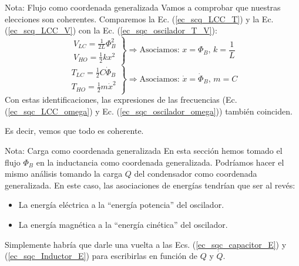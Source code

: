         \begin{mybox_blue}{Nota: Flujo como coordenada generalizada}
            Vamos a comprobar que nuestras elecciones son coherentes. Comparemos la Ec. (\ref{ec_scq_LCC_T}) y la Ec. (\ref{ec_scq_LCC_V}) con la Ec. (\ref{ec_sqc_oscilador_T_V}):
            \begin{equation}
                \left.
                \begin{aligned}
                    V_{LC} = \frac{1}{2L} \Phi_B^2 \\
                    V_{HO} = \frac{1}{2} k x^2
                \end{aligned}
                \right\} \Rightarrow \text{Asociamos: } x = \Phi_B, \, k = \frac{1}{L} 
            \end{equation}
            \begin{equation}
                \left.
                \begin{aligned}
                    T_{LC} = \frac{1}{2} C \dot{\Phi}_B\\
                    T_{HO} = \frac{1}{2} m \dot{x}^2
                \end{aligned}
                \right\} \Rightarrow \text{Asociamos: } \dot{x} = \dot{\Phi}_B, \, m = C
            \end{equation}
            Con estas identificaciones, las expresiones de las frecuencias (Ec. (\ref{ec_sqc_LCC_omega}) y Ec. (\ref{ec_sqc_oscilador_omega})) también coinciden. 
            \vspace{0.3cm}
            
            Es decir, vemos que todo es coherente. 
        \end{mybox_blue}

        \begin{mybox_blue}{Nota: Carga como coordenada generalizada}
            En esta sección hemos tomado el flujo $\Phi_B$ en la inductancia como coordenada generalizada. Podríamos hacer el mismo análisis tomando la carga $Q$ del condensador como coordenada generalizada.  En este caso, las asociaciones de energías tendrían que ser al revés:
            \begin{itemize}
                \item La energía eléctrica a la ``energía potencia'' del oscilador.  
                \item La energía magnética a la ``energía cinética'' del oscilador.  
            \end{itemize}
            Simplemente habría que darle una vuelta a las Ecs. (\ref{ec_sqc_capacitor_E}) y (\ref{ec_sqc_Inductor_E}) para escribirlas en función de $Q$ y $\dot{Q}$.
        \end{mybox_blue}
        
